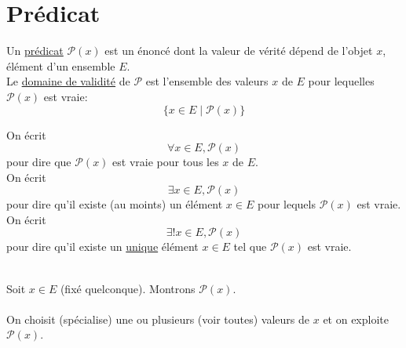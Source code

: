 \part{Prédicat}

\begin{defn}
	Un \underline{prédicat} $\mathcal{P}(x)$ est un énoncé dont la valeur de vérité dépend de l'objet $x$, élément d'un ensemble $E$.\\
	Le \underline{domaine de validité} de $\mathcal{P}$ est l'ensemble des valeurs $x$ de $E$ pour lequelles $\mathcal{P}(x)$ est vraie: \[
		\{x \in E  \mid \mathcal{P}(x)\} 
	\]
\end{defn}

\begin{rmk}
	[Notation]
	On écrit \[
		\forall x \in E, \mathcal{P}(x)
	\] pour dire que $\mathcal{P}(x)$ est vraie pour tous les $x$ de $E$.\\

	On écrit \[
		\exists x \in E, \mathcal{P}(x)
	\] pour dire qu'il existe (au moints) un élément $x \in E$ pour lequels $\mathcal{P}(x)$ est vraie.\\

	On écrit \[
		\exists! x \in E, \mathcal{P}(x)
	\] pour dire qu'il existe un \underline{unique} élément $x \in E$ tel que $\mathcal{P}(x)$ est vraie.
\end{rmk}

\vspace{5mm}
~~
\\
Soit $x \in E$ (fixé quelconque). Montrons $\mathcal{P}(x)$.\\

\vspace{2mm}
\\
On choisit (spécialise) une ou plusieurs (voir toutes) valeurs de $x$ et on exploite $\mathcal{P}(x)$.\\

\vspace{8mm}

